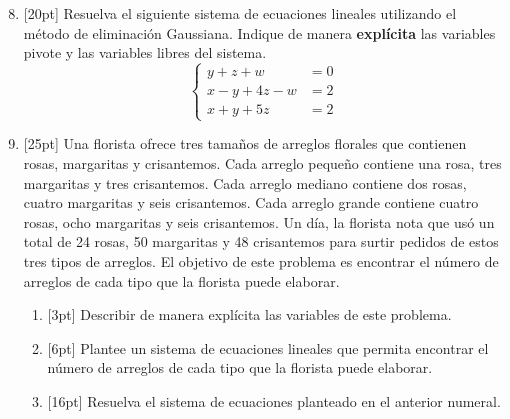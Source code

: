 \documentclass[11pt]{article}
\begin{document}
\begin{enumerate}
\setcounter{enumi}{7}
\item{}[20pt] Resuelva el siguiente sistema de ecuaciones lineales utilizando el método de eliminación Gaussiana. Indique de manera \textbf{explícita} las variables pivote y las variables libres del sistema.
\[
\left\{
\begin{aligned}
y + z + w &= 0\\
x - y + 4z - w &= 2\\
x + y + 5z &= 2
\end{aligned}
\right.
\]

\vspace{4cm}

\item{}[25pt] Una florista ofrece tres tamaños de arreglos florales que contienen rosas, margaritas y crisantemos. Cada arreglo pequeño contiene una rosa, tres margaritas y tres crisantemos. Cada arreglo mediano contiene dos rosas, cuatro margaritas y seis crisantemos. Cada arreglo grande contiene cuatro rosas, ocho margaritas y seis crisantemos. Un día, la florista nota que usó un total de 24 rosas, 50 margaritas y 48 crisantemos para surtir pedidos de estos tres tipos de arreglos. El objetivo de este problema es encontrar el número de arreglos de cada tipo que la florista puede elaborar.
\begin{enumerate}
\item{}[3pt] Describir de manera explícita las variables de este problema.

\vspace{2.5cm}

\item{}[6pt] Plantee un sistema de ecuaciones lineales que permita encontrar el número de arreglos de cada tipo que la florista puede elaborar.

\vspace{2.5cm}

\item{}[16pt] Resuelva el sistema de ecuaciones planteado en el anterior numeral.

\vspace{2cm}
\end{enumerate}
\end{enumerate}

\examfooter
\end{document}
